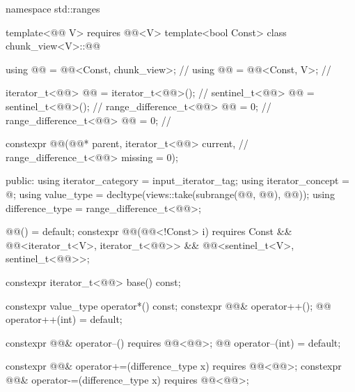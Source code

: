 %
\begin{codeblock}
namespace std::ranges {
  template<@@ V>
    requires @@<V>
  template<bool Const>
  class chunk_view<V>::@@ {
    using @@ = @@<Const, chunk_view>;                      // \expos
    using @@ = @@<Const, V>;                                 // \expos

    iterator_t<@@> @@ = iterator_t<@@>();                     // \expos
    sentinel_t<@@> @@ = sentinel_t<@@>();                         // \expos
    range_difference_t<@@> @@ = 0;                                    // \expos
    range_difference_t<@@> @@ = 0;                              // \expos

    constexpr @@(@@* parent, iterator_t<@@> current,       // \expos
                       range_difference_t<@@> missing = 0);

  public:
    using iterator_category = input_iterator_tag;
    using iterator_concept = @\seebelow@;
    using value_type = decltype(views::take(subrange(@@, @@), @@));
    using difference_type = range_difference_t<@@>;

    @@() = default;
    constexpr @@(@@<!Const> i)
      requires Const && @@<iterator_t<V>, iterator_t<@@>>
                     && @@<sentinel_t<V>, sentinel_t<@@>>;

    constexpr iterator_t<@@> base() const;

    constexpr value_type operator*() const;
    constexpr @@& operator++();
    @@ operator++(int) = default;

    constexpr @@& operator--() requires @@<@@>;
    @@ operator--(int) = default;

    constexpr @@& operator+=(difference_type x)
      requires @@<@@>;
    constexpr @@& operator-=(difference_type x)
      requires @@<@@>;

}}
\end{codeblock}

